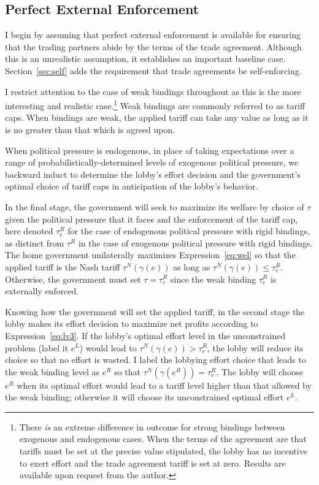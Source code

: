 \documentclass[12pt]{article}
\newcommand{\ga}{\gamma}
\begin{document}
\subsection{Perfect External Enforcement}
\label{sec:perfect}
I begin by assuming that perfect external enforcement is available for ensuring that the trading partners abide by the terms of the trade agreement. Although this is an unrealistic assumption, it establishes an important baseline case. Section~\ref{sec:self} adds the requirement that trade agreements be self-enforcing.

I restrict attention to the case of weak bindings throughout as this is the more interesting and realistic case.\footnote{There \textit{is} an extreme difference in outcome for strong bindings between exogenous and endogenous cases. When the terms of the agreement are that tariffs must be set at the precise value stipulated, the lobby has no incentive to exert effort and the trade agreement tariff is set at zero. Results are available upon request from the author.} Weak bindings are commonly referred to as tariff caps. When bindings are weak, the applied tariff can take any value as long as it is no greater than that which is agreed upon.

When political pressure is endogenous, in place of taking expectations over a range of probabilistically-determined levels of exogenous political pressure, we backward induct to determine the lobby's effort decision and the government's optimal choice of tariff caps in anticipation of the lobby's behavior.

In the final stage, the government will seek to maximize its welfare by choice of $\tau$ given the political pressure that it faces and the enforcement of the tariff cap, here denoted $\tau_e^R$ for the case of endogenous political pressure with rigid bindings, as distinct from $\tau^R$ in the case of exogenous political pressure with rigid bindings. The home government unilaterally maximizes Expression~\ref{eq:wel} so that the applied tariff is the Nash tariff $\tau^N(\ga(e))$ as long as $\tau^N(\ga(e)) \leq \tau_e^R$. Otherwise, the government must set $\tau = \tau_e^R$ since the weak binding $\tau_e^R$ is externally enforced.

Knowing how the government will set the applied tariff, in the second stage the lobby makes its effort decision to maximize net profits according to Expression~\ref{eq:lv3}. If the lobby's optimal effort level in the unconstrained problem (label it $e^L$) would lead to $\tau^N(\ga(e)) > \tau_e^R$, the lobby will reduce its choice so that no effort is wasted. I label the lobbying effort choice that leads to the weak binding level as $e^R$ so that $\tau^N(\ga(e^R)) = \tau_e^R$. The lobby will choose $e^R$ when its optimal effort would lead to a tariff level higher than that allowed by the weak binding; otherwise it will choose its unconstrained optimal effort $e^L$. 
\end{document}
